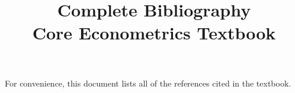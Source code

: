 \documentclass[nohyper]{external/tufte-handout}
\title[Complete bibliography]%
{Complete Bibliography \\
  Core Econometrics Textbook}
\begin{document}
\maketitle

For convenience, this document lists all of the references cited in
the textbook.

\nocite{*}


\end{document}
